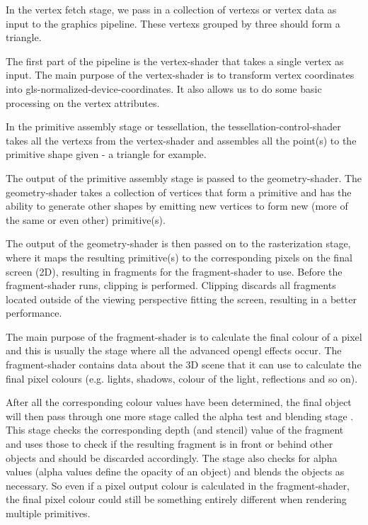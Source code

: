 In the vertex fetch stage, we pass in a collection of \glspl{vertex} or \gls{vertex} data as input to the graphics pipeline. These \glspl{vertex} grouped by three should form a triangle.

The first part of the pipeline is the \gls{vertex-shader} that takes a single \gls{vertex} as input. The main purpose of the  \gls{vertex-shader} is to transform \gls{vertex} coordinates into \gls{gls-normalized-device-coordinates}. It also allows us to do some basic processing on the vertex attributes.

In the primitive assembly stage or \gls{tessellation}, the \gls{tessellation-control-shader} takes all the \glspl{vertex} from the \gls{vertex-shader} and assembles all the point(s) to the \gls{primitive} shape given - a triangle for example.

The output of the primitive assembly stage is passed to the \gls{geometry-shader}. The \gls{geometry-shader} takes a collection of vertices that form a \gls{primitive} and has the ability to generate other shapes by emitting new vertices to form new (more of the same or even other) \gls{primitive}(s). 

The output of the \gls{geometry-shader} is then passed on to the rasterization stage, where it maps the resulting \gls{primitive}(s) to the corresponding pixels on the final screen (2D), resulting in fragments for the \gls{fragment-shader} to use. Before the \gls{fragment-shader} runs, clipping is performed. Clipping discards all fragments located outside of the viewing perspective fitting the screen, resulting in a better performance.

The main purpose of the \gls{fragment-shader} is to calculate the final colour of a pixel and this is usually the stage where all the advanced \gls{opengl} effects occur. The \gls{fragment-shader} contains data about the 3D scene that it can use to calculate the final pixel colours (e.g. lights, shadows, colour of the light, reflections and so on).

After all the corresponding colour values have been determined, the final object will then pass through one more stage called the alpha test \cite{alphatest} and blending stage \cite{blendtest}. This stage checks the corresponding depth (and stencil) value of the fragment and uses those to check if the resulting fragment is in front or behind other objects and should be discarded accordingly. The stage also checks for alpha values (alpha values define the opacity of an object) and blends the objects as necessary. So even if a pixel output colour is calculated in the \gls{fragment-shader}, the final pixel colour could still be something entirely different when rendering multiple \glspl{primitive}.

